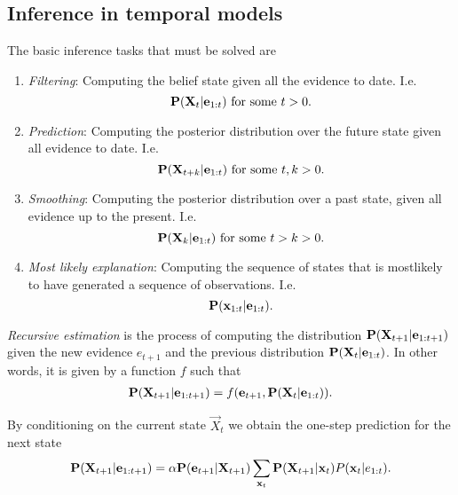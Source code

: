 \documentclass{article}
\begin{document}
\subsection{Inference in temporal models}

\begin{proposition}[R\&N p. 570]
    The basic inference tasks that must be solved are
    \begin{enumerate}
        \item \emph{Filtering}: Computing the belief state given all the evidence to date.
        I.e. \[\P(\vec X_t | \vec e_{1:t}) \text{ for some } t>0.\]
        \item \emph{Prediction}: Computing the posterior distribution over the future
        state given all evidence to date. I.e. \[\P(\vec X_{t+k}|\vec e_{1:t})\text{ for some }t,k>0.\]
        \item \emph{Smoothing}: Computing the posterior distribution over a past state, given all evidence
        up to the present. I.e. \[\P(\vec X_k | \vec e_{1:t}) \text{ for some } t>k>0.\] 
        \item \emph{Most likely explanation}: Computing the sequence of states that is mostlikely to have
        generated a sequence of observations. I.e. \[\P(\vec x_{1:t}|\vec e_{1:t}).\]
    \end{enumerate}
\end{proposition}


\begin{definition}
    \emph{Recursive estimation} is the process of computing the distribution $\P(\vec X_{t+1}|\vec e_{1:t+1})$
    given the new evidence $e_{t+1}$ and the previous distribution $\P(\vec X_t|\vec e_{1:t})$. In other words,
    it is given by a function $f$ such that
    \begin{align*}
        \P(\vec X_{t+1}|\vec e_{1:t+1})=f(\vec e_{t+1}, \P(\vec X_t|\vec e_{1:t})).
    \end{align*}
\end{definition}

\begin{theorem}[R\&N p. 572]
    By conditioning on the current state $\vec X_t$ we obtain the one-step prediction for the
    next state
    \begin{align*}
        \P(\vec X_{t+1}|\vec e_{1:t+1}) = \alpha \P(\vec e_{t+1}|\vec X_{t+1})\sum_{\vec x_t} \P(\vec X_{t+1}|\vec x_t)P(\vec x_t|e_{1:t}).
    \end{align*}
\end{theorem}
\end{document}
